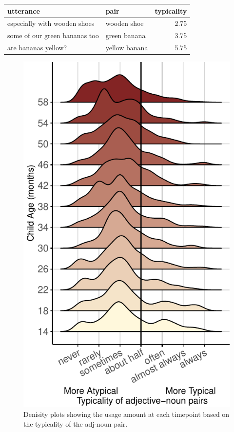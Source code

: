 \documentclass[10pt, letterpaper]{article}
\newenvironment{CodeChunk}{}{}
\begin{document}
\begin{table}[tb]
\centering
\begin{tabular}{llr}
  \hline
utterance & pair & typicality \\ 
  \hline
especially with wooden shoes & wooden shoe & 2.75 \\ 
  some of our green bananas too & green banana & 3.75 \\ 
  are bananas yellow? & yellow banana & 5.75 \\ 
   \hline
\end{tabular}
\end{table}

\begin{CodeChunk}
\begin{figure}[tb]

{\centering \includegraphics{figs/distribution_plot-1} 

}

\caption[Denisity plots showing the usage amount at each timepoint based on the typicality of the adj-noun pair]{Denisity plots showing the usage amount at each timepoint based on the typicality of the adj-noun pair.}\label{fig:distribution_plot}
\end{figure}
\end{CodeChunk}
\end{document}
